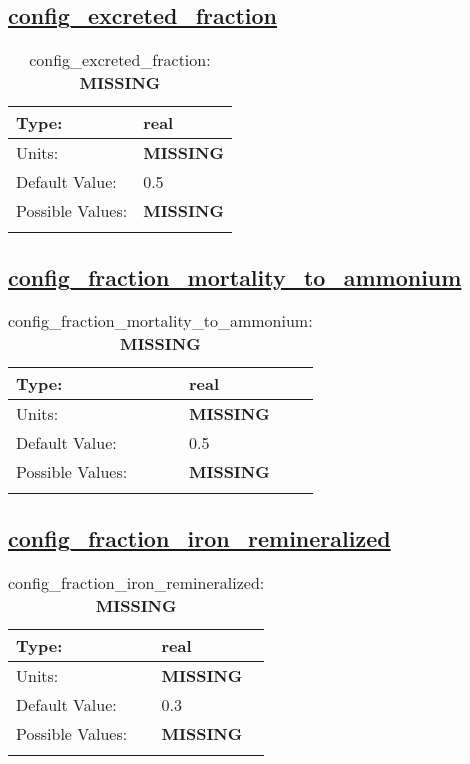 \subsection[config\_excreted\_fraction]{\hyperref[sec:nm_tab_biogeochemistry]{config\_excreted\_fraction}}
\label{subsec:nm_sec_config_excreted_fraction}
\begin{center}
\begin{longtable}{| p{2.0in} || p{4.0in} |}
    \hline
    Type: & real \\
    \hline
    Units: & {\bf \color{red} MISSING} \\
    \hline
    Default Value: & 0.5 \\
    \hline
    Possible Values: & {\bf \color{red} MISSING} \\
    \hline
    \caption{config\_excreted\_fraction: {\bf \color{red} MISSING}}
\end{longtable}
\end{center}
\subsection[config\_fraction\_mortality\_to\_ammonium]{\hyperref[sec:nm_tab_biogeochemistry]{config\_fraction\_mortality\_to\_ammonium}}
\label{subsec:nm_sec_config_fraction_mortality_to_ammonium}
\begin{center}
\begin{longtable}{| p{2.0in} || p{4.0in} |}
    \hline
    Type: & real \\
    \hline
    Units: & {\bf \color{red} MISSING} \\
    \hline
    Default Value: & 0.5 \\
    \hline
    Possible Values: & {\bf \color{red} MISSING} \\
    \hline
    \caption{config\_fraction\_mortality\_to\_ammonium: {\bf \color{red} MISSING}}
\end{longtable}
\end{center}
\subsection[config\_fraction\_iron\_remineralized]{\hyperref[sec:nm_tab_biogeochemistry]{config\_fraction\_iron\_remineralized}}
\label{subsec:nm_sec_config_fraction_iron_remineralized}
\begin{center}
\begin{longtable}{| p{2.0in} || p{4.0in} |}
    \hline
    Type: & real \\
    \hline
    Units: & {\bf \color{red} MISSING} \\
    \hline
    Default Value: & 0.3 \\
    \hline
    Possible Values: & {\bf \color{red} MISSING} \\
    \hline
    \caption{config\_fraction\_iron\_remineralized: {\bf \color{red} MISSING}}
\end{longtable}
\end{center}
